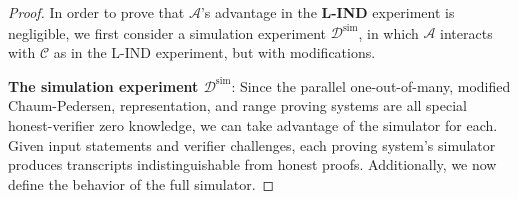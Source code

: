 \documentclass{llncs}
\begin{document}
\begin{proof}
In order to prove that $\mathcal{A}$'s advantage in the \textbf{L-IND} experiment is negligible, we first consider a simulation experiment $\mathcal{D}^{\text{sim}}$, in which $\mathcal{A}$ interacts with $\mathcal{C}$ as in the L-IND experiment, but with modifications.

\textbf{The simulation experiment $\mathcal{D}^{\text{sim}}$}: Since the parallel one-out-of-many, modified Chaum-Pedersen, representation, and range proving systems are all special honest-verifier zero knowledge, we can take advantage of the simulator for each.
Given input statements and verifier challenges, each proving system's simulator produces transcripts indistinguishable from honest proofs.
Additionally, we now define the behavior of the full simulator.


\end{proof}
\end{document}
